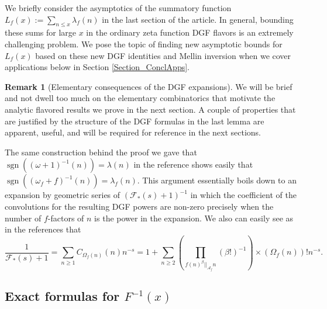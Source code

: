 \documentclass[11pt,reqno,a4letter]{article}
\numberwithin{figure}{section}
\numberwithin{table}{section}
\theoremstyle{plain}
\numberwithin{theorem}{section}
\theoremstyle{definition}
\newtheorem{remark}[theorem]{Remark}
\begin{document}
We briefly consider the asymptotics of the summatory function 
$L_{f}(x) := \sum_{n \leq x} \lambda_f(n)$ in the last section of the 
article. In general, bounding these sums for large $x$ in the ordinary 
zeta function DGF flavors is an extremely challenging problem. 
We pose the topic of finding new asymptotic bounds for 
$L_f(x)$ based on these new DGF identities and Mellin inversion when 
we cover applications below in Section \ref{Section_ConclApps}. 

\begin{remark}[Elementary consequences of the DGF expansions] 
We will be brief and not dwell too much on the elementary combinatorics that 
motivate the analytic flavored results we prove in the next section. 
A couple of properties that are justified by the structure of the 
DGF formulas in the last lemma are apparent, useful, and will be required 
for reference in the next sections. 

The same construction behind the proof we gave that 
$\operatorname{sgn}((\omega+1)^{-1}(n)) = \lambda(n)$ in the reference 
\cite{SCHMIDT-MERTENS-2021} shows easily that 
$\operatorname{sgn}((\omega_f+f)^{-1}(n)) = \lambda_f(n)$. This argument essentially 
boils down to an expansion by geometric series of $(\mathcal{F}_{\ast}(s)+1)^{-1}$ 
in which the coefficient of the convolutions for the resulting DGF powers are non-zero 
precisely when the number of $f$-factors of $n$ is the power in the expansion. 
We also can easily see as in the references \cite{SCHMIDT-MERTENS-2021,FROBERG-1953} that 
\[
\frac{1}{\mathcal{F}_{\ast}(s) + 1} = \sum_{n \geq 1} C_{\Omega_f(n)}(n) n^{-s} = 
     1 + \sum_{n \geq 2} \left(\prod_{f(n)^{\beta} ||_{\mathcal{A}_f} n} (\beta!)^{-1}\right) 
     \times (\Omega_f(n))! n^{-s}. 
\]
\end{remark}

\subsection{Exact formulas for $F^{-1}(x)$} 
\end{document}
